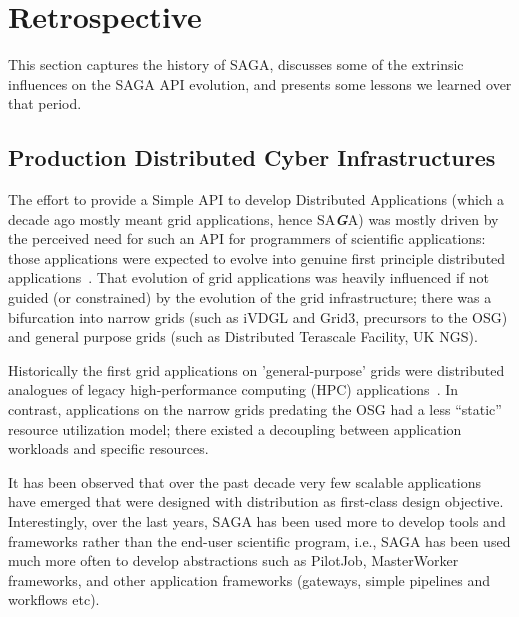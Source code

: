 \documentclass{article}
\newcommand{\BI}[1]{\textbf{\textit{#1}}}
\begin{document}
\section{Retrospective}
\label{sec:retro}

 This section captures the history of SAGA, discusses some of the
 extrinsic influences on the SAGA API evolution, and presents some
 lessons we learned over that period.  


 \subsection{Production Distributed Cyber Infrastructures}

  The effort to provide a Simple API to develop Distributed Applications
  (which a decade ago mostly meant grid applications, hence SA\BI{G}A)
  was mostly driven by the perceived need for such an API for
  programmers of scientific applications: those applications were
  expected to evolve into genuine first principle distributed
  applications~\cite{gat}.  That evolution of grid applications was
  heavily influenced if not guided (or constrained) by the evolution of
  the grid infrastructure; there was a bifurcation into narrow grids
  (such as iVDGL and Grid3, precursors to the OSG) and general purpose
  grids (such as Distributed Terascale Facility, UK NGS).

  Historically the first grid applications on 'general-purpose' grids
  were distributed analogues of legacy high-performance computing (HPC)
  applications~\cite{dpagrid2009}. In contrast, applications on the
  narrow grids predating the OSG had a less ``static'' resource
  utilization model; there existed a decoupling between application
  workloads and specific resources\cite{boinc}.

  It has been observed that over the past decade very few
  scalable applications have emerged that were designed with 
  distribution as first-class design objective. Interestingly,
  over the last years, SAGA has been used more to develop
  tools and frameworks rather than the end-user scientific program,
  i.e., SAGA has been used much more often to develop abstractions such
  as PilotJob, MasterWorker frameworks, and other application frameworks
  (gateways, simple pipelines and workflows etc).
\end{document}
